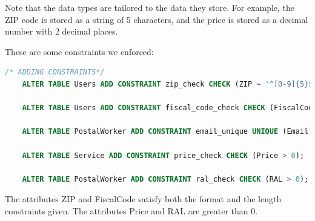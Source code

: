 \documentclass{article}
\begin{document}
Note that the data types are tailored to the data they store. For example, the ZIP code is stored as a string of 5 characters, and the price is stored as a decimal number with 2 decimal places.

These are some constraints we enforced:
\begin{lstlisting}[language=SQL]
    /* ADDING CONSTRAINTS*/
    ALTER TABLE Users ADD CONSTRAINT zip_check CHECK (ZIP ~ '^[0-9]{5}$');
    
    ALTER TABLE Users ADD CONSTRAINT fiscal_code_check CHECK (FiscalCode ~ '^[A-Z]{6}[0-9]{2}[A-Z][0-9]{2}[A-Z][0-9]{3}[A-Z]$');
    
    ALTER TABLE PostalWorker ADD CONSTRAINT email_unique UNIQUE (Email);
    
    ALTER TABLE Service ADD CONSTRAINT price_check CHECK (Price > 0);
    
    ALTER TABLE PostalWorker ADD CONSTRAINT ral_check CHECK (RAL > 0);
\end{lstlisting}

The attributes ZIP and FiscalCode satisfy both the format and the length constraints given. The attributes Price and RAL are greater than 0.
\end{document}
